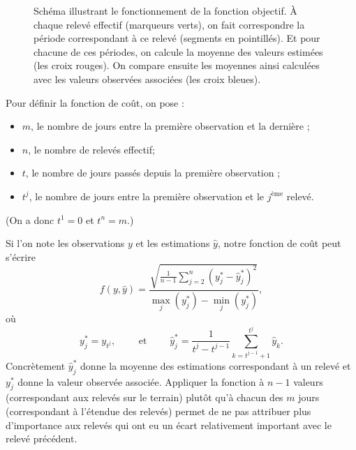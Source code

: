 \begin{figure}[ht]
\caption{Schéma illustrant le fonctionnement de la fonction objectif. À chaque relevé effectif (marqueurs verts), on fait correspondre la période correspondant à ce relevé (segments en pointillés).
Et pour chacune de ces périodes, on calcule la moyenne des valeurs estimées (les croix rouges). On compare ensuite les moyennes ainsi calculées avec les valeurs observées associées (les croix bleues).}
\label{fig:calib}
\end{figure}

Pour définir la fonction de coût, on pose :
\begin{itemize}
 \item $m$, le nombre de jours entre la première observation et la dernière ;
 \item $n$, le nombre de relevés effectif;
 \item $t$, le nombre de jours passés depuis la première observation ;
 \item $t^j$, le nombre de jours entre la première observation et le $j^{\text{ème}}$ relevé.
\end{itemize}
(On a donc $t^1 = 0$ et $t^n = m$.)

Si l'on note les observations $y$ et les estimations $\hat y$, notre fonction de coût peut s'écrire
$$
f(y, \hat y) = \frac{\sqrt{\frac{1}{n-1}\sum_{j=2}^n\left( y^*_j - \hat y^*_j \right)^2}}{\max_j(y^*_j) - \min_j(y^*_j)},
$$
où 
$$y^*_j =  y_{t^j}, \qquad \text{ et } \qquad \hat y^*_j = \frac{1}{t^j - t^{j-1}}\sum_{k=t^{j-1}+1}^{t^j} \hat y_k.$$
Concrètement $\hat y^*_j$ donne la moyenne des estimations correspondant à un relevé et $y^*_j$ donne la valeur observée associée.
Appliquer la fonction à $n-1$ valeurs (correspondant aux relevés sur le terrain) plutôt qu'à chacun des $m$ jours (correspondant à l'étendue des relevés) permet de ne pas attribuer plus d'importance aux relevés qui ont eu un écart relativement important avec le relevé précédent.




